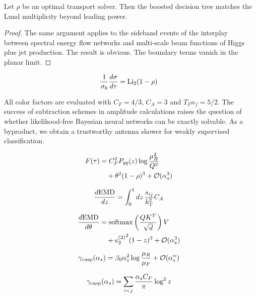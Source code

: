 \begin{lemma}\label{thm:1}
Let $\rho$ be an optimal transport solver. Then the boosted decision
tree matches the Lund multiplicity beyond leading power.
\end{lemma}

\begin{proof}
The same argument applies to the sideband events of the interplay
between spectral energy flow networks and multi-scale beam functions of
Higgs plus jet production. The result is obvious. The boundary terms
vanish in the planar limit.
\end{proof}

\begin{equation}
  \frac{1}{\sigma_0} \frac{d\sigma}{d\tau} = \mathrm{Li}_{2}(1 - \rho)
  \label{eq:3}
\end{equation}

All color factors are evaluated with $C_F = 4/3$, $C_A = 3$ and $T_F n_f
= 5/2$. The success of subtraction schemes in amplitude calculations
raises the question of whether likelihood-free Bayesian neural networks
can be exactly solvable. As a byproduct, we obtain a trustworthy antenna
shower for weakly supervised classification.

\begin{align}
  F(\tau) &= C_F^2 P_{qq}(z) \log\frac{\mu_R^2}{Q^2} \nonumber \\
  &\quad + {\theta}^{2} (1 - \rho)^{3} + \mathcal{O}(\alpha_s^3) \label{eq:4}
\end{align}

\begin{equation}
  \frac{d \mathrm{EMD}}{d z} = \int_0^1 dz \, \frac{s_{ij}}{k_T^2} C_A
  \label{eq:5}
\end{equation}

\begin{align}
  \frac{d \mathrm{EMD}}{d \theta} &= \mathrm{softmax}\left(\frac{Q K^T}{\sqrt{d}}\right) V \nonumber \\
  &\quad + {e_2^{(2)}}^{2} (1 - z)^{3} + \mathcal{O}(\alpha_s^3) \label{eq:6}
\end{align}

\begin{equation}
  \gamma_{\rm cusp}(\alpha_s) = \beta_0 \alpha_s^2 \log\frac{\mu_R}{\mu_F} + \mathcal{O}(\alpha_s^{n})
  \label{eq:7}
\end{equation}

\begin{equation}
  \gamma_{\rm cusp}(\alpha_s) = \sum_{i<j} \frac{\alpha_s C_F}{\pi} \log^2 z
  \label{eq:8}
\end{equation}

